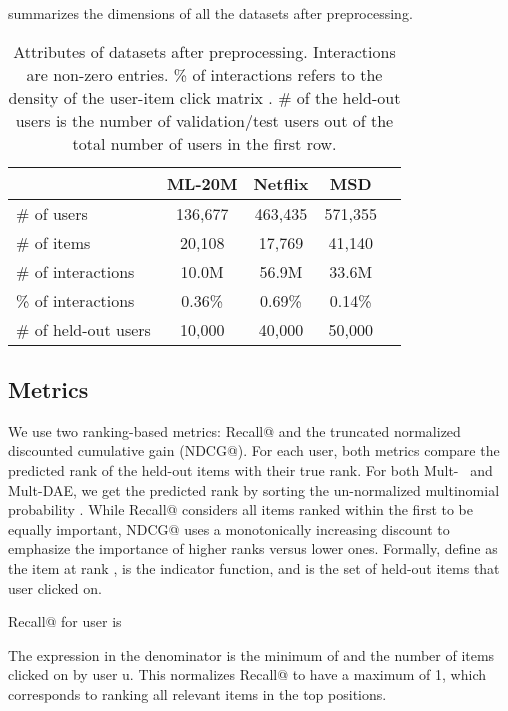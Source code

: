 \documentclass[sigconf]{acmart}
\newcommand{\mvae}{{\small Mult-}}
\newcommand{\mdae}{{\small Mult-}\gls{DAE}}
\begin{document}
 summarizes the dimensions
of all the datasets after preprocessing.

\begin{table}
\begin{center}
\caption{Attributes of datasets after preprocessing. Interactions
are non-zero entries. \%  of interactions refers to the density of the user-item
click matrix . \# of the held-out users is the number of validation/test users out of the total number of users in the first row. }
\begin{tabular}{ l c c c c }
  \toprule
   & \textbf{ML-20M} & \textbf{Netflix} & \textbf{MSD}  \\
  \midrule
  \# of users & 136,677 & 463,435 & 571,355  \\
  \# of items & 20,108 & 17,769 & 41,140  \\
  \# of interactions & 10.0M & 56.9M & 33.6M\\
  \% of interactions & 0.36\% & 0.69\% & 0.14\% \\
  \midrule
  \# of held-out users & 10,000 & 40,000 & 50,000 \\
  \bottomrule
\end{tabular}
\label{tab:data}
\end{center}
\end{table}

\subsection{Metrics}\label{sec:exp_metrics}

We use two ranking-based metrics: Recall@ and the truncated normalized
discounted cumulative gain (NDCG@). For each user, both metrics compare the predicted rank of the held-out items with their
true rank. For both \mvae~ and \mdae, we get the predicted rank by sorting the un-normalized multinomial probability . While Recall@ considers all items ranked within
the first  to be equally important, NDCG@ uses
a monotonically increasing discount to emphasize the importance
of higher ranks versus lower ones. Formally, define  as the item at rank ,  is the indicator function, and  is the set of held-out items that user  clicked on.

Recall@ for user  is


The expression in the denominator is the minimum
of  and the number of items clicked on by user
u. This normalizes Recall@ to have a maximum of 1,
which corresponds to ranking all relevant items in the top
 positions.
\end{document}
